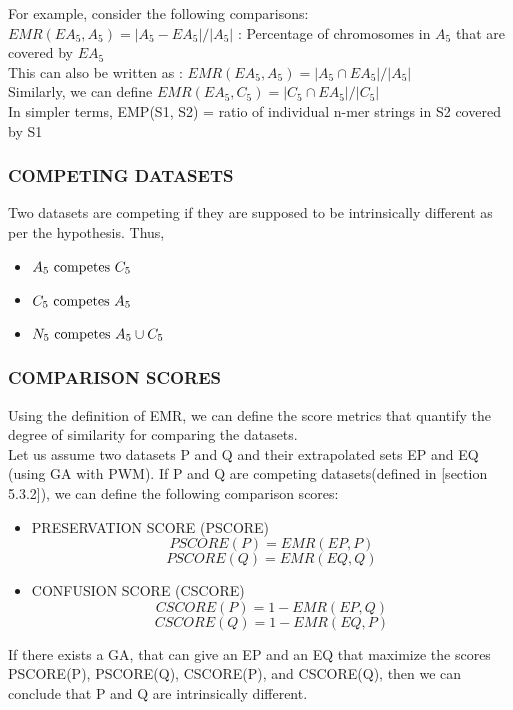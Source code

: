 \documentclass[12pt,a4paper]{article}
\begin{document}
	For example, consider the following comparisons:\\
	$ EMR(EA_5, A_5) = |A_5 - EA_5| / |A_5| $ : Percentage of chromosomes in $A_5$ that are covered by $EA_5$ \\
	This can also be written as : $ EMR(EA_5, A_5) = |A_5 \cap EA_5| / |A_5| $ \\
	Similarly, we can define $ EMR(EA_5, C_5) = |C_5 \cap EA_5| / |C_5| $ \\
	In simpler terms, EMP(S1, S2) = ratio of individual n-mer strings in S2 covered by S1

	\subsubsection{COMPETING DATASETS}
	Two datasets are competing if they are supposed to be intrinsically different as per the hypothesis.
	Thus,
	\begin{itemize}
	\item $A_5 \textnormal{ competes } C_5$
	\item $C_5 \textnormal{ competes } A_5$
	\item $N_5 \textnormal{ competes } A_5 \cup C_5$
	\end{itemize}

	\subsubsection{COMPARISON SCORES}
	Using the definition of EMR, we can define the score metrics that quantify the degree of similarity for comparing the datasets.\\
	Let us assume two datasets P and Q and their extrapolated sets EP and EQ (using GA with PWM). If P and Q are competing datasets(defined in [section 5.3.2]), we can define the following comparison scores:
	\begin{itemize}
		\item PRESERVATION SCORE (PSCORE)
		$$ PSCORE(P) = EMR(EP, P) $$
		$$ PSCORE(Q) = EMR(EQ, Q) $$
		\item CONFUSION SCORE (CSCORE)
		$$ CSCORE(P) = 1 - EMR(EP, Q) $$
		$$ CSCORE(Q) = 1 - EMR(EQ, P) $$
	\end{itemize}
	If there exists a GA, that can give an EP and an EQ that maximize the scores PSCORE(P), PSCORE(Q), CSCORE(P), and CSCORE(Q), then we can conclude that P and Q are intrinsically different.
	
\end{document}
